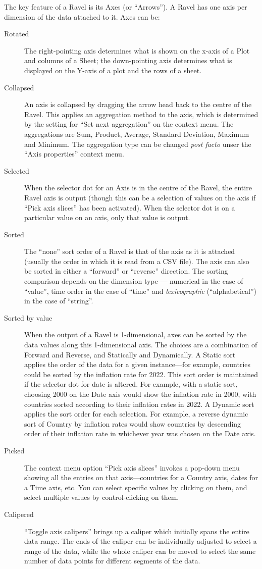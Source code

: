 The key feature of a Ravel is its Axes (or ``Arrows''). A Ravel
has one axis per dimension of the data attached to it. Axes can be:
\begin{description}
\item[Rotated] The right-pointing axis determines what is shown on
the x-axis of a Plot and columns of a Sheet; the down-pointing axis
determines what is displayed on the Y-axis of a plot and the rows
of a sheet.
\item[Collapsed] An axis is collapsed by dragging the arrow head
back to the centre of the Ravel. This applies an aggregation method
to the axis, which is determined by the setting for ``Set next aggregation''
on the context menu. The aggregations are Sum, Product, Average, Standard
Deviation, Maximum and Minimum. The aggregation type can be changed
{\em post facto} unser the ``Axis properties'' context menu. 
\item[Selected] When the selector dot for an Axis is in the centre
of the Ravel, the entire Ravel axis is output (though this can be a selection
of values on the axis if ``Pick axis slices'' has been activated).
When the selector dot is on a particular value on an axis, only that
value is output.
\item[Sorted] The ``none'' sort order of a Ravel is that of
the axis as it is attached (usually the order in which it is read from
a CSV file). The axis can also be sorted in
either a ``forward'' or ``reverse''  direction. The sorting comparison
depends on the dimension type --- numerical in the case of ``value'',
time order in the case of ``time'' and {\em lexicographic}
(``alphabetical'') in the case of ``string''.
\item[Sorted by value] When the output of a Ravel is 1-dimensional,
axes can be sorted by the data values along this 1-dimensional axis.
The choices are a combination of Forward and Reverse, and Statically
and Dynamically. A Static sort applies the order of the data for a
given instance---for example, countries could be sorted by the inflation
rate for 2022. This sort order is maintained if the selector dot for
date is altered. For example, with a static sort, choosing 2000 on
the Date axis would show the inflation rate in 2000, with countries
sorted according to their inflation rates in 2022. A Dynamic sort
applies the sort order for each selection. For example, a reverse
dynamic sort of Country by inflation rates would show countries by
descending order of their inflation rate in whichever year was chosen
on the Date axis.
\item[Picked] The context menu option ``Pick axis slices'' invokes
a pop-down menu showing all the entries on that axis---countries
for a Country axis, dates for a Time axis, etc. You can select specific
values by clicking on them, and select multiple values by control-clicking
on them.
\item[Calipered] ``Toggle axis calipers'' brings up a caliper which
initially spans the entire data range. The ends of the caliper can
be individually adjusted to select a range of the data, while the
whole caliper can be moved to select the same number of data points
for different segments of the data.
\end{description}
